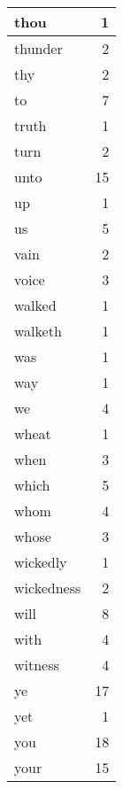 \begin{center}
\begin{longtable}{l|r}
thou & 1 \\ \hline
thunder & 2 \\ \hline
thy & 2 \\ \hline
to & 7 \\ \hline
truth & 1 \\ \hline
turn & 2 \\ \hline
unto & 15 \\ \hline
up & 1 \\ \hline
us & 5 \\ \hline
vain & 2 \\ \hline
voice & 3 \\ \hline
walked & 1 \\ \hline
walketh & 1 \\ \hline
was & 1 \\ \hline
way & 1 \\ \hline
we & 4 \\ \hline
wheat & 1 \\ \hline
when & 3 \\ \hline
which & 5 \\ \hline
whom & 4 \\ \hline
whose & 3 \\ \hline
wickedly & 1 \\ \hline
wickedness & 2 \\ \hline
will & 8 \\ \hline
with & 4 \\ \hline
witness & 4 \\ \hline
ye & 17 \\ \hline
yet & 1 \\ \hline
you & 18 \\ \hline
your & 15 \\ \hline
\end{longtable}
\end{center}



\normalsize



